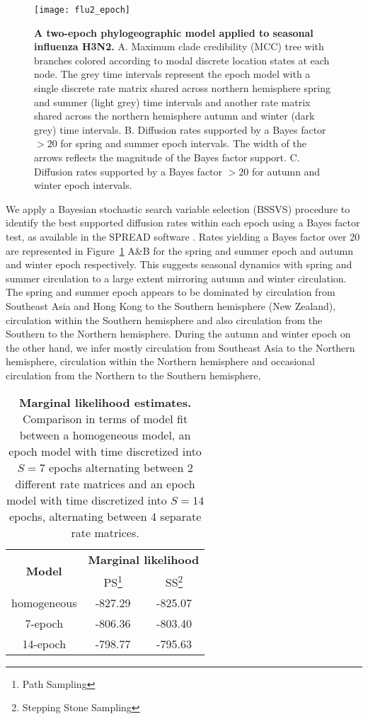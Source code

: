 \begin{figure}[h!]
\centering
\texttt{[image: flu2\_epoch]} 
\caption{
{ \footnotesize 
{\bf A two-epoch phylogeographic model applied to seasonal influenza H3N2.} 
A. Maximum clade credibility (MCC) tree with branches colored according to modal discrete location states at each node. The grey time intervals represent the epoch model with a single discrete rate matrix shared across northern hemisphere spring and summer (light grey) time intervals and another rate matrix shared across the northern hemisphere autumn and winter (dark grey) time intervals. B. Diffusion rates supported by a Bayes factor $>20$ for spring and summer epoch intervals. The width of the arrows reflects the magnitude of the Bayes factor support. C. Diffusion rates supported by a Bayes factor $>20$ for autumn and winter epoch intervals.
}%
}
\label{fig:2EpochFlu}
\end{figure}

We apply a Bayesian stochastic search variable selection (BSSVS) procedure to identify the best supported diffusion rates within each epoch using a Bayes factor test, as available in the SPREAD software \citep{Bielejec2011}. Rates yielding a Bayes factor over 20 are represented in Figure~\ref{fig:2EpochFlu} A\&B for the spring and summer epoch and autumn and winter epoch respectively.
This suggests seasonal dynamics with spring and summer circulation to a large extent mirroring autumn and winter circulation.
The spring and summer epoch appears to be dominated by circulation from Southeast Asia and Hong Kong to the Southern hemisphere (New Zealand), circulation within the Southern hemisphere and also circulation from the Southern to the Northern hemisphere.
During the autumn and winter epoch on the other hand, we infer mostly circulation from Southeast Asia to the Northern hemisphere, circulation within the Northern hemisphere and occasional circulation from the Northern to the Southern hemisphere,

\begin{table}[h!]
\begin{minipage}{\textwidth} 
\centering
\footnotesize{
\begin{tabular}{ccc}
\hline 
\multirow{2}{*}{\textbf{Model}} & \multicolumn{2}{c}{\textbf{Marginal likelihood}}\tabularnewline
 & PS\footnote{Path Sampling} & SS\footnote{Stepping Stone Sampling}\tabularnewline
\hline 
homogeneous & -827.29 & -825.07\tabularnewline
7-epoch & -806.36  & -803.40 \tabularnewline
14-epoch & -798.77  & -795.63 \tabularnewline
\end{tabular}
} %
\caption{
{ \footnotesize 
{\bf Marginal likelihood estimates.} Comparison in terms of model fit between a homogeneous model, an epoch model with time discretized into $S=7$ epochs alternating between 2 different rate matrices and an epoch model with time discretized into $S=14$ epochs, alternating between 4 separate rate matrices.
} %
}
\label{tab:flu_ps}
\end{minipage}
\end{table}


